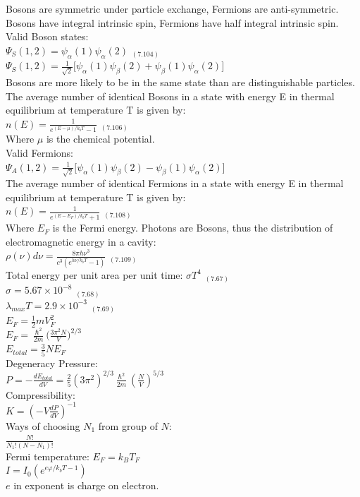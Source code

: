 \documentclass[0pt]{report}
\begin{document}
\begin{multicols*}{3}
\begin{flushleft}
Bosons are symmetric under particle exchange, Fermions are anti-symmetric. Bosons have integral intrinsic spin, Fermions have half integral intrinsic spin.\\
Valid Boson states:\\
$\Psi_S(1,2)=\psi_{\alpha}(1)\psi_{\alpha}(2)$ $_{(7.104)}$\\
$\Psi_S(1,2)=\frac{1}{\sqrt{2}}\big[\psi_{\alpha}(1)\psi_{\beta}(2)+\psi_{\beta}(1)\psi_{\alpha}(2)\big]$\\
Bosons are more likely to be in the same state than are distinguishable particles.
The average number of identical Bosons in a state with energy E in thermal equilibrium at temperature T is given by:\\
$n(E)=\frac{1}{e^{(E-\mu)/k_bT}-1}$ $_{(7.106)}$\\
Where $\mu$ is the chemical potential.\\
Valid Fermions:\\
$\Psi_A(1,2)=\frac{1}{\sqrt{2}}\big[\psi_{\alpha}(1)\psi_{\beta}(2)-\psi_{\beta}(1)\psi_{\alpha}(2)\big]$\\
The average number of identical Fermions in a state with energy E in thermal equilibrium at temperature T is given by:\\
$n(E)=\frac{1}{e^{(E-E_F)/k_bT}+1}$ $_{(7.108)}$\\
Where $E_F$ is the Fermi energy.
Photons are Bosons, thus the distribution of electromagnetic energy in a cavity:\\
$\rho(\nu)d\nu=\frac{8\pi h\nu^3}{c^3(e^{h\nu/k_b T}-1)}$ $_{(7.109)}$\\
Total energy per unit area per unit time:
$\sigma T^4$ $_{(7.67)}$\\
$\sigma=5.67\times10^{-8}$ $_{(7.68)}$\\
$\lambda_{max}T=2.9\times10^{-3}$ $_{(7.69)}$\\
$E_F=\frac{1}{2}mV_F^2$\\
$E_F=\frac{\hslash^2}{2m}\Big(\frac{3\pi^2N}{V}\Big)^{2/3}$\\
$E_{total}=\frac{3}{5}NE_F$\\
Degeneracy Pressure:\\
$P=-\frac{dE_{total}}{dV}=\frac{2}{5}(3\pi^2)^{2/3}\frac{\hslash^2}{2m}(\frac{N}{V})^{5/3}$\\
Compressibility:\\
$K=(-V\frac{dP}{dV})^{-1}$\\
Ways of choosing $N_1$ from group of $N$:\\
$\frac{N!}{N_1!(N-N_1)!}$\\
Fermi temperature: 
$E_F=k_BT_F$\\
$I=I_0(e^{e\varphi/k_bT-1})$\\
$e$ in exponent is charge on electron.\\


\end{flushleft}
\end{multicols*}
\end{document}

